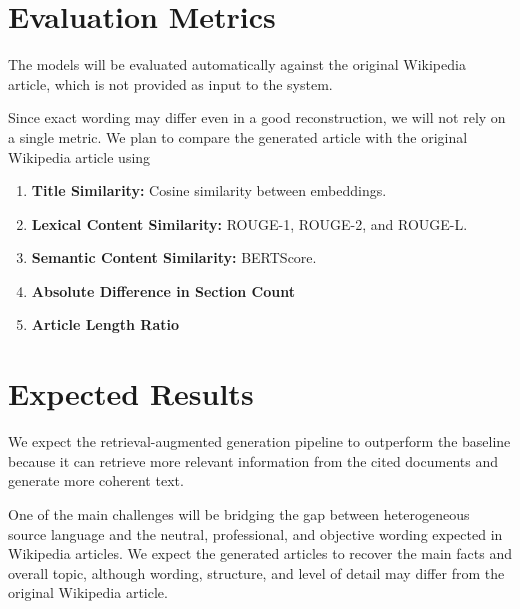 \documentclass[10pt,a4paper]{article}
\begin{document}
\section{Evaluation Metrics}

The models will be evaluated automatically against the original Wikipedia article, which is not provided as input to the system.

Since exact wording may differ even in a good reconstruction, we will not rely on a single metric. We plan to compare the generated article with the original Wikipedia article using

\begin{enumerate}
    \item \textbf{Title Similarity:} Cosine similarity between embeddings.
    \item \textbf{Lexical Content Similarity:} ROUGE-1, ROUGE-2, and ROUGE-L.
    \item \textbf{Semantic Content Similarity:} BERTScore.
    \item \textbf{Absolute Difference in Section Count}
    \item \textbf{Article Length Ratio}
\end{enumerate}

\section{Expected Results}

We expect the retrieval-augmented generation pipeline to outperform the baseline because it can retrieve more relevant information from the cited documents and generate more coherent text.

One of the main challenges will be bridging the gap between heterogeneous source language and the neutral, professional, and objective wording expected in Wikipedia articles. We expect the generated articles to recover the main facts and overall topic, although wording, structure, and level of detail may differ from the original Wikipedia article.
\end{document}
